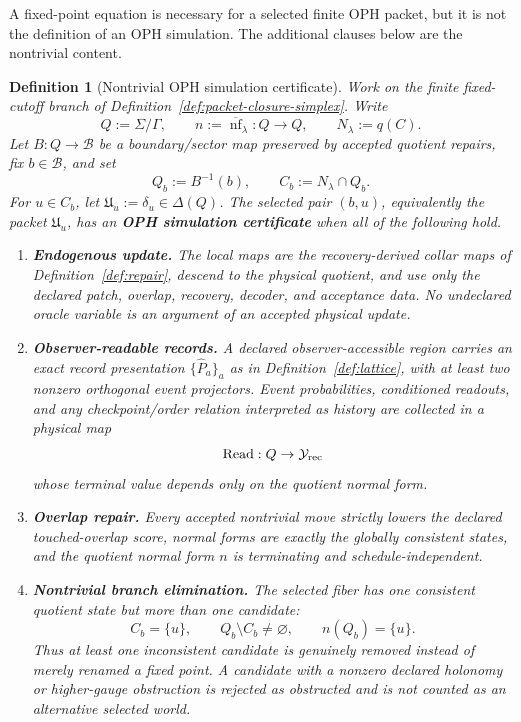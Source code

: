 \documentclass[11pt]{article}
\newtheorem{definition}[theorem]{Definition}
\theoremstyle{remark}
\theoremstyle{plain}
\begin{document}
A fixed-point equation is necessary for a selected finite OPH packet, but it is not the
definition of an OPH simulation. The additional clauses below are the nontrivial content.

\begin{definition}[Nontrivial OPH simulation certificate]\label{def:oph-simulation}
Work on the finite fixed-cutoff branch of Definition~\ref{def:packet-closure-simplex}. Write
\[
 Q:=\Sigma/\Gamma,
 \qquad
 n:=\overline{\operatorname{nf}}_\lambda:Q\to Q,
 \qquad
 N_\lambda:=q(C).
\]
Let \(B:Q\to\mathcal B\) be a boundary/sector map preserved by accepted quotient repairs,
fix \(b\in\mathcal B\), and set
\[
 Q_b:=B^{-1}(b),
 \qquad
 C_b:=N_\lambda\cap Q_b.
\]
For \(u\in C_b\), let \(\mathfrak U_u:=\delta_u\in\Delta(Q)\). The selected pair
\((b,u)\), equivalently the packet \(\mathfrak U_u\), has an \textbf{OPH simulation
certificate} when all of the following hold.
\begin{enumerate}[label=(S\arabic*),leftmargin=3.0em]
\item \textbf{Endogenous update.} The local maps are the recovery-derived collar maps of
Definition~\ref{def:repair}, descend to the physical quotient, and use only the declared
patch, overlap, recovery, decoder, and acceptance data. No undeclared oracle variable is an
argument of an accepted physical update.

\item \textbf{Observer-readable records.} A declared observer-accessible region carries an
exact record presentation \(\{\widehat P_a\}_a\) as in Definition~\ref{def:lattice}, with at
least two nonzero orthogonal event projectors. Event probabilities, conditioned readouts, and
any checkpoint/order relation interpreted as history are collected in a physical map
\[
 \operatorname{Read}:Q\to\mathcal Y_{\rm rec}
\]
whose terminal value depends only on the quotient normal form.

\item \textbf{Overlap repair.} Every accepted nontrivial move strictly lowers the declared
touched-overlap score, normal forms are exactly the globally consistent states, and the
quotient normal form \(n\) is terminating and schedule-independent.

\item \textbf{Nontrivial branch elimination.} The selected fiber has one consistent
quotient state but more than one candidate:
\[
 C_b=\{u\},
 \qquad
 Q_b\setminus C_b\ne\varnothing,
 \qquad
 n(Q_b)=\{u\}.
\]
Thus at least one inconsistent candidate is genuinely removed instead of merely renamed a
fixed point. A candidate with a nonzero declared holonomy or higher-gauge obstruction is
rejected as obstructed and is not counted as an alternative selected world.


\end{enumerate}
\end{definition}
\end{document}
